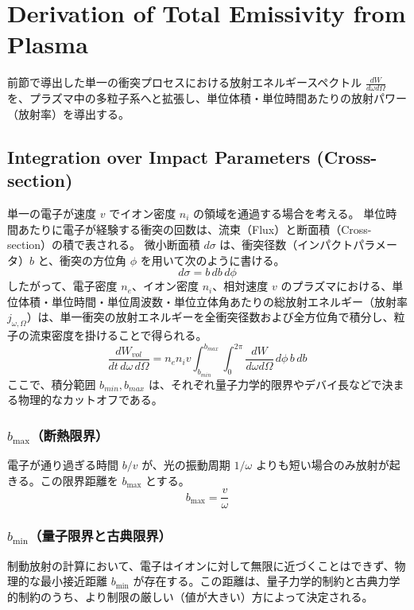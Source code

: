 \documentclass[a4paper,11pt]{bxjsarticle} %
\begin{document}
\section{Derivation of Total Emissivity from Plasma}

前節で導出した単一の衝突プロセスにおける放射エネルギースペクトル $\frac{dW}{d\omega d\Omega}$ を、プラズマ中の多粒子系へと拡張し、単位体積・単位時間あたりの放射パワー（放射率）を導出する。

\subsection{Integration over Impact Parameters (Cross-section)}
単一の電子が速度 $v$ でイオン密度 $n_i$ の領域を通過する場合を考える。
単位時間あたりに電子が経験する衝突の回数は、流束（Flux）と断面積（Cross-section）の積で表される。
微小断面積 $d\sigma$ は、衝突径数（インパクトパラメータ）$b$ と、衝突の方位角 $\phi$ を用いて次のように書ける。
\begin{equation}
    d\sigma = b \, db \, d\phi
\end{equation}
したがって、電子密度 $n_e$、イオン密度 $n_i$、相対速度 $v$ のプラズマにおける、単位体積・単位時間・単位周波数・単位立体角あたりの総放射エネルギー（放射率 $j_{\omega, \Omega}$）は、単一衝突の放射エネルギーを全衝突径数および全方位角で積分し、粒子の流束密度を掛けることで得られる。
\begin{equation}
    \frac{dW_{vol}}{dt \, d\omega \, d\Omega} = n_e n_i v \int_{b_{min}}^{b_{max}} \int_{0}^{2\pi} \frac{dW}{d\omega d\Omega} \, d\phi \, b \, db
\end{equation}
ここで、積分範囲 $b_{min}, b_{max}$ は、それぞれ量子力学的限界やデバイ長などで決まる物理的なカットオフである。

\subsubsection{$b_{\max}$（断熱限界）}
電子が通り過ぎる時間 $b/v$ が、光の振動周期 $1/\omega$ よりも短い場合のみ放射が起きる。この限界距離を $b_{\max}$ とする。
\begin{equation}
    b_{\max} = \frac{v}{\omega} 
\end{equation}

\subsubsection{$b_{\min}$（量子限界と古典限界）}

制動放射の計算において、電子はイオンに対して無限に近づくことはできず、物理的な最小接近距離 $b_{\min}$ が存在する。この距離は、量子力学的制約と古典力学的制約のうち、より制限の厳しい（値が大きい）方によって決定される。
\end{document}
